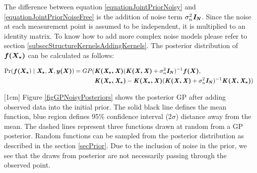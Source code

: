 The difference between equation \ref{equationJointPriorNoisy} and \ref{equationJointPriorNoiseFree} is the addition of noise term $\sigma^{2}_{n}\bm{\mathit{I_N}}$. Since the noise at each measurement point is assumed to be independent, it is multiplied to an identity matrix. To know how to add more complex noise models please refer to section \ref{subsecStructureKernelsAddingKernels}. The posterior distribution of $\boldsymbol{f(X_{*})}$ can be calculated as follows:

  \begin{equation}\label{eqNoisyPredictiveGP}
  \begin{aligned}
  \Pr(\boldsymbol{f(X_{*}}) \mid \bm{\mathit{X_{*}}}, \bm{\mathit{X}}, \boldsymbol{y(X)}) = GP(  & \bm{\mathit{K(X_{*}, X)}}( \bm{\mathit{K(X, X)}} + \sigma^{2}_{n}\bm{\mathit{I_N}} )^{-1}\boldsymbol{f(X)},   \\ 
                                & \bm{\mathit{K(X_{*}, X_{*})}} - \bm{\mathit{K(X_{*}, X)}}( \bm{\mathit{K(X, X)}} + \sigma^{2}_{n}\bm{\mathit{I_N}} )^{-1} \bm{\mathit{K(X, X_{*})}})
  \end{aligned}
  \end{equation}


[1cm]
Figure \ref{figGPNoisyPosteriors} shows the posterior GP after adding observed data into the initial prior. The solid black line defines the mean function, blue region defines 95\% confidence interval (2$\sigma$) distance away from the mean. The dashed lines represent three functions drawn at random from a GP posterior. Random functions can be sampled from the posterior distribution as described in the section \ref{secPrior}.  Due to the inclusion of noise in the prior, we see that the draws from posterior are not necessarily passing through the observed point.

